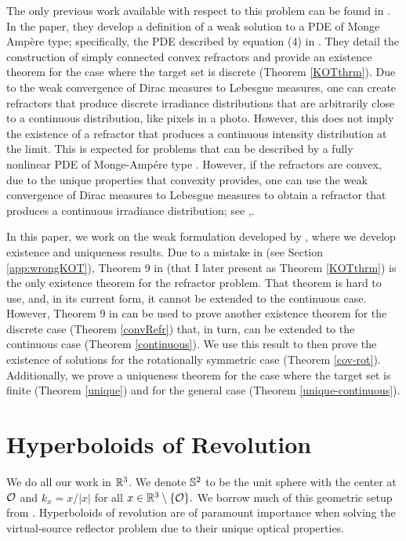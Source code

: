 \documentclass[review]{elsarticle}
\begin{document}
The only previous work available with respect to this problem can be found in \cite{KOT}. In the paper, they develop a definition of a weak solution to a PDE of Monge Amp\`ere type; specifically, the PDE described by equation (4) in \cite{KOT}. They detail the construction of simply connected convex refractors and provide an existence theorem for the case where the target set is discrete (Theorem \ref{KOTthrm}). Due to the weak convergence of Dirac measures to Lebesgue measures, one can create refractors that produce discrete irradiance distributions that are arbitrarily close to a continuous distribution, like pixels in a photo. However, this does not imply the existence of a refractor that produces a continuous intensity distribution at the limit. This is expected for problems that can be described by a fully nonlinear PDE of Monge-Amp\'ere type \cite{Oliker1989}. However, if the refractors are convex, due to the unique properties that convexity provides, one can use the weak convergence of Dirac measures to Lebesgue measures to obtain a refractor that produces a continuous irradiance distribution; see \cite{OK1},\cite{para}. 
 
In this paper, we work on the weak formulation developed by \cite{KOT}, where we develop existence and uniqueness results. Due to a mistake in \cite{KOT} (see Section \ref{app:wrongKOT}), Theorem 9 in \cite{KOT} (that I later present as Theorem \ref{KOTthrm}) is the only existence theorem for the refractor problem. That theorem is hard to use, and, in its current form, it cannot be extended to the continuous case. However, Theorem 9 in \cite{KOT} can be used to prove another existence theorem for the discrete case (Theorem \ref{convRefr}) that, in turn, can be extended to the continuous case (Theorem \ref{continuous}). We use this result to then prove the existence of solutions for the rotationally symmetric case (Theorem \ref{cov-rot}). Additionally, we prove a uniqueness theorem for the case where the target set is finite (Theorem \ref{unique}) and for the general case (Theorem \ref{unique-continuous}). 




\section{Hyperboloids of Revolution}\label{hyper-background}

We do all our work in $\mathbb{R}^3$. We denote $\mathbb{S}^2$ to be the unit sphere with the center at $\mathcal{O}$ and $k_x=x/|x|$ for all $x\in \mathbb{R}^3\setminus\{\mathcal{O}\}.$ We borrow much of this geometric setup from \cite{KOT}. Hyperboloids of revolution are of paramount importance when solving the virtual-source reflector problem due to their unique optical properties.
\end{document}
